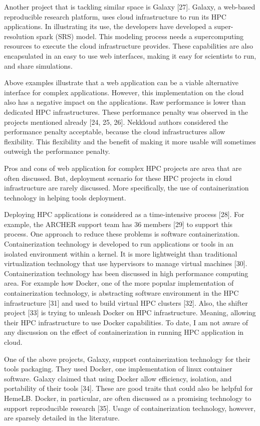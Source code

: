 Another project that is tackling similar space is Galaxy [27]. Galaxy, a web-based reproducible research platform, uses cloud infrastructure to run its HPC applications. In illustrating its use, the developers have developed a super-resolution spark (SRS) model. This modeling process needs a supercomputing resources to execute the cloud infrastructure provides. These capabilities are also encapsulated in an easy to use web interfaces, making it easy for scientists to run, and share simulations.

Above examples illustrate that a web application can be a viable alternative interface for complex applications. However, this implementation on the cloud also has a negative impact on the applications. Raw performance is lower than dedicated HPC infrastructures. These performance penalty was observed in the projects mentioned already [24, 25, 26]. Nekkloud authors considered the performance penalty acceptable, because the cloud infrastructures allow flexibility. This flexibility and the benefit of making it more usable will sometimes outweigh the performance penalty.

Pros and cons of web application for complex HPC projects are area that are often discussed. But, deployment scenario for these HPC projects in cloud infrastructure are rarely discussed. More specifically, the use of containerization technology in helping tools deployment.

Deploying HPC applications is considered as a time-intensive process [28]. For example, the ARCHER support team has 36 members [29] to support this process. One approach to reduce these problems is software containerization. Containerization technology is developed to run applications or tools in an isolated environment within a kernel. It is more lightweight than traditional virtualization technology that use hypervisors to manage virtual machines [30]. Containerization technology has been discussed in high performance computing area. For example how Docker, one of the more popular implementation of containerization technology, is abstracting software environment in the HPC infrastructure [31] and used to build virtual HPC clusters [32]. Also, the shifter project [33] is trying to unleash Docker on HPC infrastructure. Meaning, allowing their HPC infrastructure to use Docker capabilities. To date, I am not aware of any discussion on the effect of containerization in running HPC application in cloud.

One of the above projects, Galaxy, support containerization technology for their tools packaging. They used Docker, one implementation of linux container software. Galaxy claimed that using Docker allow efficiency, isolation, and portability of their tools [34]. These are good traits that could also be helpful for HemeLB. Docker, in particular, are often discussed as a promising technology to support reproducible research [35]. Usage of containerization technology, however, are sparsely detailed in the literature.

